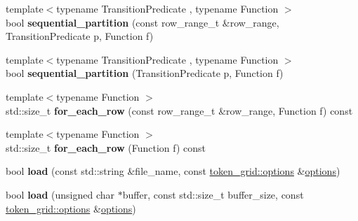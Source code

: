 \begin{DoxyCompactItemize}
\item 
\hypertarget{classstrtk_1_1token__grid_a4132c76d361ab57bc4dc82cde926b5cf}{{\footnotesize template$<$typename Transition\-Predicate , typename Function $>$ }\\bool {\bfseries sequential\-\_\-partition} (const row\-\_\-range\-\_\-t \&row\-\_\-range, Transition\-Predicate p, Function f)}\label{classstrtk_1_1token__grid_a4132c76d361ab57bc4dc82cde926b5cf}

\item 
\hypertarget{classstrtk_1_1token__grid_a95f13f0e94201dbdfa6087ebe2cc2c97}{{\footnotesize template$<$typename Transition\-Predicate , typename Function $>$ }\\bool {\bfseries sequential\-\_\-partition} (Transition\-Predicate p, Function f)}\label{classstrtk_1_1token__grid_a95f13f0e94201dbdfa6087ebe2cc2c97}

\item 
\hypertarget{classstrtk_1_1token__grid_a97aa8852c7d067747b6382c523a51fc3}{{\footnotesize template$<$typename Function $>$ }\\std\-::size\-\_\-t {\bfseries for\-\_\-each\-\_\-row} (const row\-\_\-range\-\_\-t \&row\-\_\-range, Function f) const }\label{classstrtk_1_1token__grid_a97aa8852c7d067747b6382c523a51fc3}

\item 
\hypertarget{classstrtk_1_1token__grid_aaa24ec0bfaaa32c506696023e667071d}{{\footnotesize template$<$typename Function $>$ }\\std\-::size\-\_\-t {\bfseries for\-\_\-each\-\_\-row} (Function f) const }\label{classstrtk_1_1token__grid_aaa24ec0bfaaa32c506696023e667071d}

\item 
\hypertarget{classstrtk_1_1token__grid_a8ea05f37ed9e771de9b3ead271019385}{bool {\bfseries load} (const std\-::string \&file\-\_\-name, const \hyperlink{structstrtk_1_1token__grid_1_1options}{token\-\_\-grid\-::options} \&\hyperlink{structstrtk_1_1token__grid_1_1options}{options})}\label{classstrtk_1_1token__grid_a8ea05f37ed9e771de9b3ead271019385}

\item 
\hypertarget{classstrtk_1_1token__grid_a5c03e0532faa379690862203d978cf60}{bool {\bfseries load} (unsigned char $\ast$buffer, const std\-::size\-\_\-t buffer\-\_\-size, const \hyperlink{structstrtk_1_1token__grid_1_1options}{token\-\_\-grid\-::options} \&\hyperlink{structstrtk_1_1token__grid_1_1options}{options})}\label{classstrtk_1_1token__grid_a5c03e0532faa379690862203d978cf60}

\end{DoxyCompactItemize}
